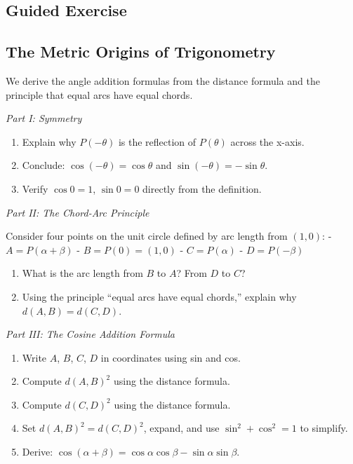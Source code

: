 \documentclass[
  10pt,
  letterpaper,
]{scrbook}
\begin{document}
\subsection{Guided Exercise}\label{guided-exercise-2}

\subsection{The Metric Origins of
Trigonometry}\label{the-metric-origins-of-trigonometry}

We derive the angle addition formulas from the distance formula and the
principle that equal arcs have equal chords.

\emph{Part I: Symmetry}

\begin{enumerate}
\def\labelenumi{(\alph{enumi})}
\item
  Explain why \(P(-\theta)\) is the reflection of \(P(\theta)\) across
  the x-axis.
\item
  Conclude: \(\cos(-\theta) = \cos\theta\) and
  \(\sin(-\theta) = -\sin\theta\).
\item
  Verify \(\cos 0 = 1\), \(\sin 0 = 0\) directly from the definition.
\end{enumerate}

\emph{Part II: The Chord-Arc Principle}

Consider four points on the unit circle defined by arc length from
\((1, 0)\): - \(A = P(\alpha + \beta)\) - \(B = P(0) = (1, 0)\) -
\(C = P(\alpha)\) - \(D = P(-\beta)\)

\begin{enumerate}
\def\labelenumi{(\alph{enumi})}
\setcounter{enumi}{3}
\item
  What is the arc length from \(B\) to \(A\)? From \(D\) to \(C\)?
\item
  Using the principle ``equal arcs have equal chords,'' explain why
  \(d(A, B) = d(C, D)\).
\end{enumerate}

\emph{Part III: The Cosine Addition Formula}

\begin{enumerate}
\def\labelenumi{(\alph{enumi})}
\setcounter{enumi}{5}
\item
  Write \(A\), \(B\), \(C\), \(D\) in coordinates using sin and cos.
\item
  Compute \(d(A, B)^2\) using the distance formula.
\item
  Compute \(d(C, D)^2\) using the distance formula.
\item
  Set \(d(A, B)^2 = d(C, D)^2\), expand, and use \(\sin^2 + \cos^2 = 1\)
  to simplify.
\item
  Derive:
  \(\cos(\alpha + \beta) = \cos\alpha\cos\beta - \sin\alpha\sin\beta\).
\end{enumerate}
\end{document}
